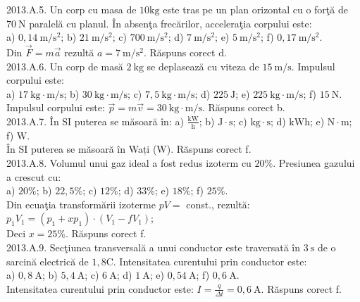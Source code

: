 2013.A.5. Un corp cu masa de $10 \mathrm{kg}$ este tras pe un plan orizontal cu o forţă de $70 \mathrm{~N}$ paralelă cu planul. În absenţa frecărilor, acceleraţia corpului este:\\ a) $0,14 \mathrm{~m} / \mathrm{s}^{2}$; b) $21 \mathrm{~m} / \mathrm{s}^{2}$; c) $700 \mathrm{~m} / \mathrm{s}^{2}$; d) $7 \mathrm{~m} / \mathrm{s}^{2}$; e) $5 \mathrm{~m} / \mathrm{s}^{2}$; f) $0,17 \mathrm{~m} / \mathrm{s}^{2}$.\\ Din $\vec{F}=m \vec{a}$ rezultă $a=7 \mathrm{~m} / \mathrm{s}^{2}$. Răspuns corect d.\\

2013.A.6. Un corp de masă $2 \mathrm{~kg}$ se deplasează cu viteza de $15 \mathrm{~m} / \mathrm{s}$. Impulsul corpului este:\\ a) $17 \mathrm{~kg} \cdot \mathrm{m} / \mathrm{s}$; b) $30 \mathrm{~kg} \cdot \mathrm{m} / \mathrm{s}$; c) $7,5 \mathrm{~kg} \cdot \mathrm{m} / \mathrm{s}$; d) $225 \mathrm{~J}$; e) $225 \mathrm{~kg} \cdot \mathrm{m} / \mathrm{s}$; f) $15 \mathrm{~N}$.\\ Impulsul corpului este: $\vec{p}=m \vec{v}=30 \mathrm{~kg} \cdot \mathrm{m} / \mathrm{s}$. Răspuns corect b.\\

2013.A.7. În SI puterea se măsoară în: a) $\frac{\mathrm{kW}}{\mathrm{h}}$; b) $\mathrm{J} \cdot \mathrm{s}$; c) $\mathrm{kg} \cdot \mathrm{s}$; d) $\mathrm{kWh}$; e) $\mathrm{N} \cdot \mathrm{m}$; f) $\mathrm{W}$.\\ În SI puterea se măsoară în Wați ($\mathrm{W}$). Răspuns corect f.\\

2013.A.8. Volumul unui gaz ideal a fost redus izoterm cu $20 \%$. Presiunea gazului a crescut cu:\\ a) $20 \%$; b) $22,5 \%$; c) $12 \%$; d) $33 \%$; e) $18 \%$; f) $25 \%$.\\ Din ecuaţia transformării izoterme $p V=$ const., rezultă:\\ $p_{1} V_{1}=\left(p_{1}+x p_{1}\right) \cdot\left(V_{1}-f V_{1}\right)$;\\ Deci $x=25 \%$. Răspuns corect f.\\

2013.A.9. Secţiunea transversală a unui conductor este traversată în $3 \mathrm{~s}$ de o sarcină electrică de $1,8 \mathrm{C}$. Intensitatea curentului prin conductor este:\\ a) $0,8 \mathrm{~A}$; b) $5,4 \mathrm{~A}$; c) $6 \mathrm{~A}$; d) $1 \mathrm{~A}$; e) $0,54 \mathrm{~A}$; f) $0,6 \mathrm{~A}$.\\ Intensitatea curentului prin conductor este: $I=\frac{q}{\Delta t}=0,6 \mathrm{~A}$. Răspuns corect f.\\

